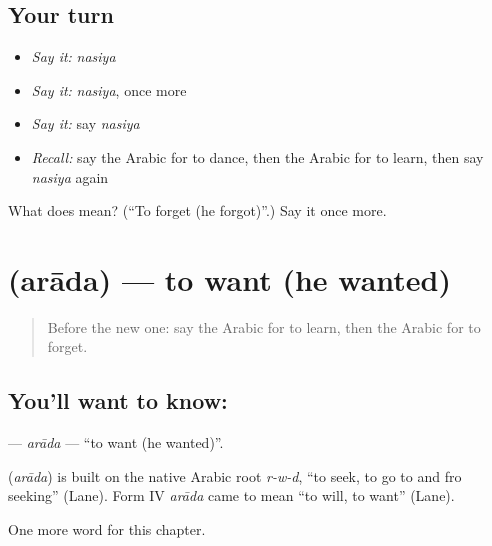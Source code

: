 \subsection*{Your turn}
\begin{itemize}
\raggedright
  \item \emph{Say it:} \emph{nasiya}
  \item \emph{Say it:} \emph{nasiya}, once more
  \item \emph{Say it:} say \emph{nasiya}
  \item \emph{Recall:} say the Arabic for to dance, then the Arabic for to learn, then say \emph{nasiya} again
\end{itemize}

\begin{tcolorbox}[breakable,colback=teal!4,colframe=teal!35!black,title={Before you move on}]
What does  mean? (\textquotedblleft{}To forget (he forgot)\textquotedblright{}.) Say it once more.
\end{tcolorbox}
\section[\texorpdfstring{\ar{أراد} (arāda)}{أراد (arāda)}]{ (arāda) — to want (he wanted)}

\label{lesson:AR-C61-arada}



\begin{quote}
Before the new one: say the Arabic for to learn, then the Arabic for to forget.
\end{quote}

\subsection*{You'll want to know: }
\textbf{} — \emph{arāda} — \textquotedblleft{}to want (he wanted)\textquotedblright{}.

\begin{cousinweb}
\textbf{} (\emph{arāda}) is built on the native Arabic root \emph{r-w-d}, \textquotedblleft{}to seek, to go to and fro seeking\textquotedblright{} (Lane). Form IV \emph{arāda} came to mean \textquotedblleft{}to will, to want\textquotedblright{} (Lane).
\end{cousinweb}

\begin{grammarlens}[title={What you've built}]
One more word for this chapter.
\end{grammarlens}

